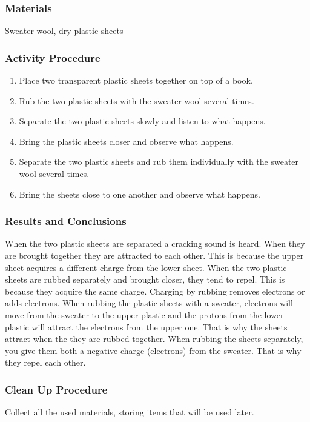 \subsubsection*{Materials}
Sweater wool, dry plastic sheets

\subsubsection*{Activity Procedure}
\begin{enumerate}
\item{Place two transparent plastic sheets together on top of a book.}
\item{Rub the two plastic sheets with the sweater wool several times.} 
\item{Separate the two plastic sheets slowly and listen to what happens.} 
\item{Bring the plastic sheets closer and observe what happens.} 
\item{Separate the two plastic sheets and rub them individually with the sweater wool several times.} 
\item{Bring the sheets close to one another and observe what happens.} 
\end{enumerate}

\subsubsection*{Results and Conclusions}
When the two plastic sheets are separated a cracking sound is heard. When they are brought together they are attracted to each other. This is because the upper sheet acquires a different charge from the lower sheet. 
When the two plastic sheets are rubbed separately and brought closer, they tend to repel. This is because they acquire the same charge. 
Charging by rubbing removes electrons or adds electrons. When rubbing the plastic sheets with a sweater, electrons will move from the sweater to the upper plastic and the protons from the lower plastic will attract the electrons from the upper one. That is why the sheets attract when the they are rubbed together. When rubbing the sheets separately, you give them both a negative charge (electrons) from the sweater. That is why they repel each other. 

\subsubsection*{Clean Up Procedure}
Collect all the used materials, storing items that will be used later.

